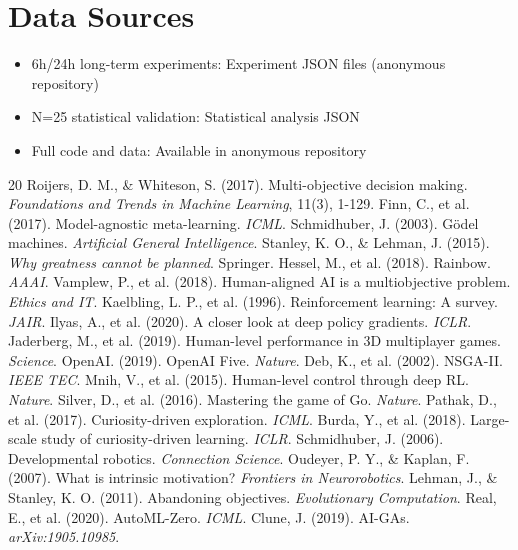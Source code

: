 \documentclass{article}
\begin{document}
\section*{Data Sources}
\begin{itemize}
    \item 6h/24h long-term experiments: Experiment JSON files (anonymous repository)
    \item N=25 statistical validation: Statistical analysis JSON
    \item Full code and data: Available in anonymous repository
\end{itemize}


\begin{thebibliography}{20}
 Roijers, D. M., \& Whiteson, S. (2017). Multi-objective decision making. \textit{Foundations and Trends in Machine Learning}, 11(3), 1-129.
 Finn, C., et al. (2017). Model-agnostic meta-learning. \textit{ICML}.
 Schmidhuber, J. (2003). G{\"o}del machines. \textit{Artificial General Intelligence}.
 Stanley, K. O., \& Lehman, J. (2015). \textit{Why greatness cannot be planned}. Springer.
 Hessel, M., et al. (2018). Rainbow. \textit{AAAI}.
 Vamplew, P., et al. (2018). Human-aligned AI is a multiobjective problem. \textit{Ethics and IT}.
 Kaelbling, L. P., et al. (1996). Reinforcement learning: A survey. \textit{JAIR}.
 Ilyas, A., et al. (2020). A closer look at deep policy gradients. \textit{ICLR}.
 Jaderberg, M., et al. (2019). Human-level performance in 3D multiplayer games. \textit{Science}.
 OpenAI. (2019). OpenAI Five. \textit{Nature}.
 Deb, K., et al. (2002). NSGA-II. \textit{IEEE TEC}.
 Mnih, V., et al. (2015). Human-level control through deep RL. \textit{Nature}.
 Silver, D., et al. (2016). Mastering the game of Go. \textit{Nature}.
 Pathak, D., et al. (2017). Curiosity-driven exploration. \textit{ICML}.
 Burda, Y., et al. (2018). Large-scale study of curiosity-driven learning. \textit{ICLR}.
 Schmidhuber, J. (2006). Developmental robotics. \textit{Connection Science}.
 Oudeyer, P. Y., \& Kaplan, F. (2007). What is intrinsic motivation? \textit{Frontiers in Neurorobotics}.
 Lehman, J., \& Stanley, K. O. (2011). Abandoning objectives. \textit{Evolutionary Computation}.
 Real, E., et al. (2020). AutoML-Zero. \textit{ICML}.
 Clune, J. (2019). AI-GAs. \textit{arXiv:1905.10985}.
\end{thebibliography}
\end{document}
